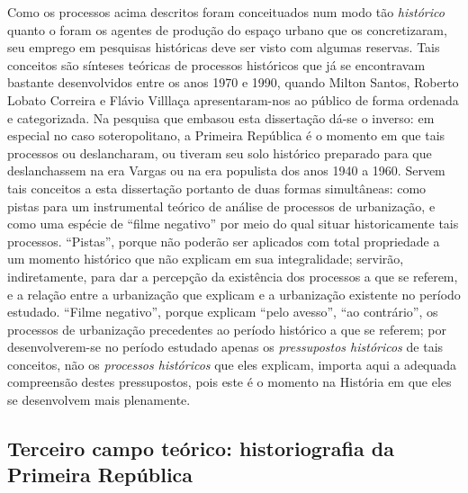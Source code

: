 Como os processos acima descritos foram conceituados num modo tão \textit{histórico} quanto o foram os agentes de produção do espaço urbano que os concretizaram, seu emprego em pesquisas históricas deve ser visto com algumas reservas. Tais conceitos são sínteses teóricas de processos históricos que já se encontravam bastante desenvolvidos entre os anos 1970 e 1990, quando Milton Santos, Roberto Lobato Correira e Flávio Villlaça apresentaram-nos ao público de forma ordenada e categorizada. Na pesquisa que embasou esta dissertação dá-se o inverso: em especial no caso soteropolitano, a Primeira República é o momento em que tais processos ou deslancharam, ou tiveram seu solo histórico preparado para que deslanchassem na era Vargas ou na era populista dos anos 1940 a 1960. Servem tais conceitos a esta dissertação portanto de duas formas simultâneas: como pistas para um instrumental teórico de análise de processos de urbanização, e como uma espécie de ``filme negativo'' por meio do qual situar historicamente tais processos. ``Pistas'', porque não poderão ser aplicados com total propriedade a um momento histórico que não explicam em sua integralidade; servirão, indiretamente, para dar a percepção da existência dos processos a que se referem, e a relação entre a urbanização que explicam e a urbanização existente no período estudado. ``Filme negativo'', porque explicam ``pelo avesso'', ``ao contrário'', os processos de urbanização precedentes ao período histórico a que se referem; por desenvolverem-se no período estudado apenas os \textit{pressupostos históricos} de tais conceitos, não os \textit{processos históricos} que eles explicam, importa aqui a adequada compreensão destes pressupostos, pois este é o momento na História em que eles se desenvolvem mais plenamente.


\subsection[Terceiro campo teórico: historiografia da Primeira República]{Terceiro campo teórico: historiografia da Primeira República}
\label{subsec:histprirep}

